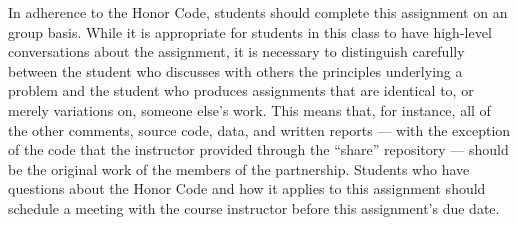 \vspace*{-.15in}


In adherence to the Honor Code, students should complete this assignment on an group basis. While it is appropriate for
students in this class to have high-level conversations about the assignment, it is necessary to distinguish carefully
between the student who discusses with others the principles underlying a problem and the student who produces
assignments that are identical to, or merely variations on, someone else's work.  This means that, for instance, all of
the other comments, source code, data, and written reports --- with the exception of the code that the instructor
provided through the ``share'' repository --- should be the original work of the members of the partnership.  Students
who have questions about the Honor Code and how it applies to this assignment should schedule a meeting with the course
instructor before this assignment's due date.


